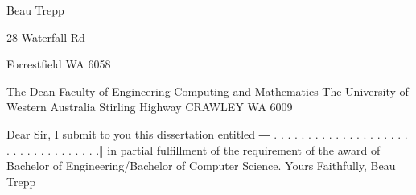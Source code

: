 
\begin{dedication} %


\begin{flushright}
 

Beau Trepp 

28 Waterfall Rd

Forrestfield WA 6058 
\end{flushright}

\begin{flushleft}
The Dean
Faculty of Engineering Computing and Mathematics \newline
The University of Western Australia  Stirling Highway \newline
CRAWLEY WA 6009 
\end{flushleft}

\begin{flushleft}
Dear Sir, \newline
  \newline
I submit to you this dissertation entitled ― . . . . . . . . . . . . . . . . . . . . . . . . . . . . . . . . . .‖ in partial fulfillment of the requirement of the award of Bachelor of Engineering/Bachelor of Computer Science.
 \newline \newline \newline
Yours Faithfully, \newline
\newline \newline
Beau Trepp 
\end{flushleft}
\end{dedication}

